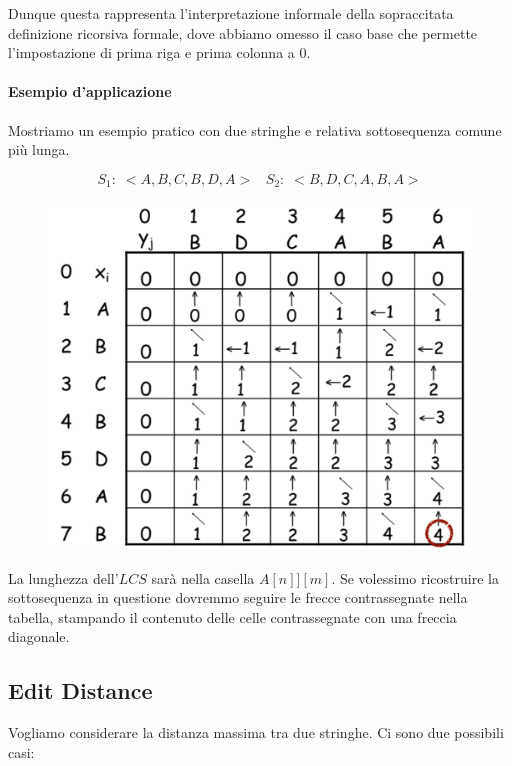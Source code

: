 \documentclass{article}
\begin{document}
Dunque questa rappresenta l'interpretazione informale della sopraccitata definizione ricorsiva formale, dove abbiamo omesso il caso base che permette l'impostazione di prima riga e prima colonna a 0.

\paragraph{Esempio d'applicazione} Mostriamo un esempio pratico con due stringhe e relativa sottosequenza comune più lunga.

\begin{equation}
    S_{1}: \; <A,B,C,B,D,A> \; \; \; S_{2}: \; <B,D,C,A,B,A> 
\end{equation}

\begin{figure}[htbp]
        \center
        \includegraphics[scale=0.4]{img/LCS4.png}
\end{figure}

La lunghezza dell'$LCS$ sarà nella casella \(A[n]][m]\). Se volessimo ricostruire la sottosequenza in questione dovremmo seguire le frecce contrassegnate nella tabella, stampando il contenuto delle celle contrassegnate con una freccia diagonale.

\newpage

\subsection{Edit Distance} Vogliamo considerare la distanza massima tra due stringhe. Ci sono due possibili casi:
\end{document}
